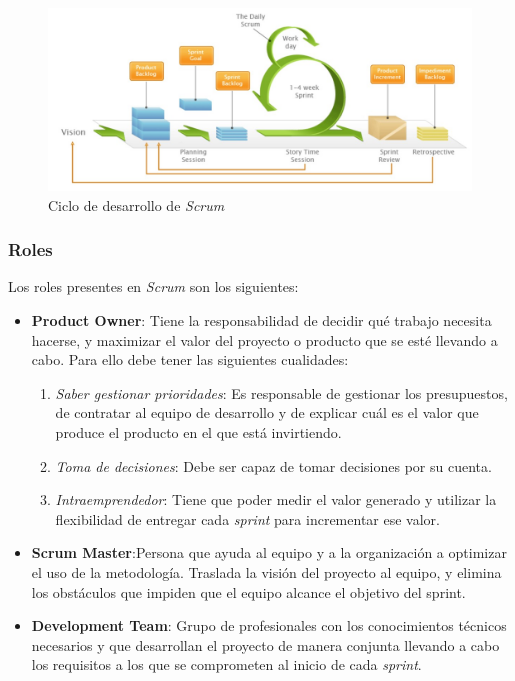 \begin{figure}[H]
    \centering
    \includegraphics[width=14cm]{Images/Ciclo_Scrum.jpg}
    \caption{Ciclo de desarrollo de \textit{Scrum}}
\end{figure}

\subsubsection{Roles}
Los roles presentes en \textit{Scrum} son los siguientes:
\begin{itemize}
    \item \textbf{Product Owner}: Tiene la responsabilidad de decidir qué trabajo necesita hacerse, y maximizar el valor 
    del proyecto o producto que se esté llevando a cabo. Para ello debe tener las siguientes cualidades:
    \begin{enumerate}
        \item \textit{Saber gestionar prioridades}: Es responsable de gestionar los presupuestos, de contratar al equipo de 
        desarrollo y de explicar cuál es el valor que produce el producto en el que está invirtiendo.
        \item \textit{Toma de decisiones}: Debe ser capaz de tomar decisiones por su cuenta.
        \item \textit{Intraemprendedor}: Tiene que poder medir el valor generado y utilizar la flexibilidad de entregar cada 
        \textit{sprint} para incrementar ese valor.
    \end{enumerate}
    
    \item \textbf{Scrum Master}:Persona que ayuda al equipo y a la organización a optimizar el uso de la 
    metodología. Traslada la visión del proyecto al equipo, y elimina los obstáculos que impiden que el equipo alcance el 
    objetivo del sprint.

    \item \textbf{Development Team}: Grupo de profesionales con los conocimientos técnicos necesarios y que desarrollan el proyecto de manera
    conjunta llevando a cabo los requisitos a los que se comprometen al inicio de cada \textit{sprint}.
\end{itemize}


